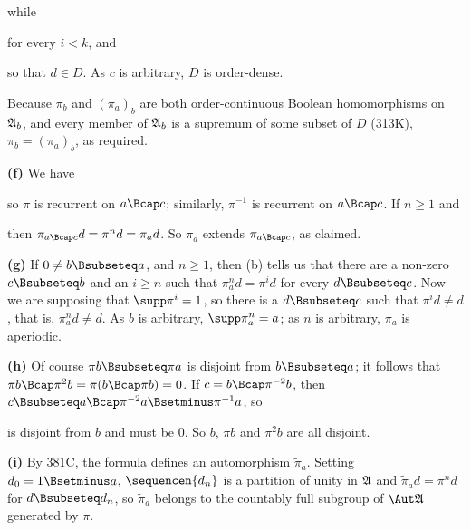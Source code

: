 {

\noindent while


\noindent for every $i<k$, and


\noindent so that $d\in D$.   As $c$ is arbitrary, $D$ is
order-dense.\ \Qed

Because $\pi_b$ and $(\pi_a)_b$ are both order-continuous Boolean
homomorphisms on $\frak A_b$, and every member of $\frak A_b$ is a
supremum of some subset of $D$ (313K), $\pi_b=(\pi_a)_b$, as required.


{\bf (f)} We have


\noindent so $\pi$ is recurrent on $a\Bcap c$;  similarly, $\pi^{-1}$ is
recurrent on $a\Bcap c$.   If $n\ge 1$ and


\noindent then $\pi_{a\Bcap c}d=\pi^nd=\pi_ad$.   So $\pi_a$ extends
$\pi_{a\Bcap c}$, as claimed.

\medskip

{\bf (g)} If $0\ne b\Bsubseteq a$, and $n\ge 1$, then (b) tells us that
there are a non-zero $c\Bsubseteq b$ and an $i\ge n$ such that
$\pi_a^nd=\pi^id$ for every $d\Bsubseteq c$.   Now we are supposing that
$\supp\pi^i=1$, so there is a $d\Bsubseteq c$ such that $\pi^id\ne d$,
that is, $\pi_a^nd\ne d$.   As $b$ is arbitrary, $\supp\pi_a^n=a$;  as
$n$ is arbitrary, $\pi_a$ is aperiodic.

\medskip

{\bf (h)} Of course $\pi b\Bsubseteq\pi a$ is disjoint from
$b\Bsubseteq a$;  it follows that $\pi b\Bcap\pi^2b=\pi(b\Bcap\pi b)=0$.
If $c=b\Bcap\pi^{-2}b$, then
$c\Bsubseteq a\Bcap\pi^{-2}a\Bsetminus\pi^{-1}a$, so


\noindent is disjoint from $b$ and must be $0$.   So $b$, $\pi b$ and
$\pi^2b$ are all disjoint.

\medskip

{\bf (i)} By 381C, the formula defines an automorphism $\tilde\pi_a$.
Setting $d_0=1\Bsetminus a$, $\sequencen{d_n}$ is a partition of unity
in $\frak A$ and $\tilde\pi_ad=\pi^nd$ for $d\Bsubseteq d_n$, so
$\tilde\pi_a$ belongs to the countably full subgroup of $\Aut\frak A$
generated by $\pi$.
}%

